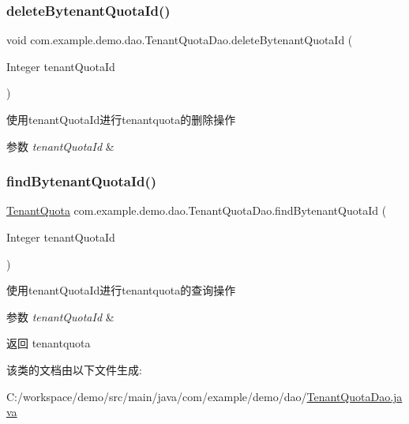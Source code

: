 \subsubsection{\texorpdfstring{delete\+Bytenant\+Quota\+Id()}{deleteBytenantQuotaId()}}
{\footnotesize\ttfamily void com.\+example.\+demo.\+dao.\+Tenant\+Quota\+Dao.\+delete\+Bytenant\+Quota\+Id (\begin{DoxyParamCaption}\item[{Integer}]{tenant\+Quota\+Id }\end{DoxyParamCaption})}

使用tenant\+Quota\+Id进行tenantquota的删除操作 
\begin{DoxyParams}{参数}
{\em tenant\+Quota\+Id} & \\
\hline
\end{DoxyParams}
\mbox{\label{interfacecom_1_1example_1_1demo_1_1dao_1_1_tenant_quota_dao_aae1ac7a929208d43ec54702caf4937e8}} 
\subsubsection{\texorpdfstring{find\+Bytenant\+Quota\+Id()}{findBytenantQuotaId()}}
{\footnotesize\ttfamily \mbox{\hyperlink{classcom_1_1example_1_1demo_1_1modular_1_1_tenant_quota}{Tenant\+Quota}} com.\+example.\+demo.\+dao.\+Tenant\+Quota\+Dao.\+find\+Bytenant\+Quota\+Id (\begin{DoxyParamCaption}\item[{Integer}]{tenant\+Quota\+Id }\end{DoxyParamCaption})}

使用tenant\+Quota\+Id进行tenantquota的查询操作 
\begin{DoxyParams}{参数}
{\em tenant\+Quota\+Id} & \\
\hline
\end{DoxyParams}
\begin{DoxyReturn}{返回}
tenantquota 
\end{DoxyReturn}


该类的文档由以下文件生成\+:\begin{DoxyCompactItemize}
\item 
C\+:/workspace/demo/src/main/java/com/example/demo/dao/\mbox{\hyperlink{_tenant_quota_dao_8java}{Tenant\+Quota\+Dao.\+java}}\end{DoxyCompactItemize}
